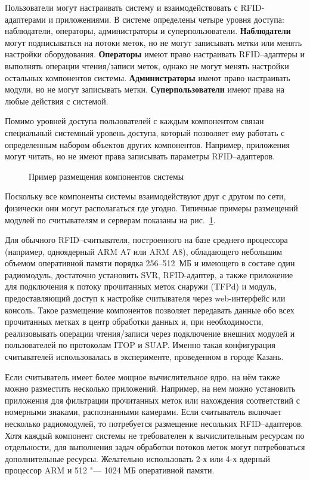 Пользователи могут настраивать систему и взаимодействовать с RFID-адаптерами и приложениями. В системе определены четыре уровня доступа: наблюдатели, операторы, администраторы и суперпользователи. \textbf{Наблюдатели} могут подписываться на потоки меток, но не могут записывать метки или менять настройки оборудования. \textbf{Операторы} имеют право настраивать RFID--адаптеры и выполнять операции чтения/записи меток, однако не могут менять настройки остальных компонентов системы. \textbf{Администраторы} имеют право настраивать модули, но не могут записывать метки. \textbf{Суперпользователи} имеют права на любые действия с системой.

Помимо уровней доступа пользователей с каждым компонентом связан специальный системный уровень доступа, который позволяет ему работать с определенным набором объектов других компонентов. Например, приложения могут читать, но не имеют права записывать параметры RFID--адаптеров.

\begin{figure}[ht]
  \caption{Пример размещения компонентов системы}
  \label{fig:ch5_deployment_example}
\end{figure}

Поскольку все компоненты системы взаимодействуют друг с другом по сети, физически они могут располагаться где угодно. Типичные примеры размещений модулей по считывателям и серверам показаны на рис.~\ref{fig:ch5_deployment_example}.

Для обычного RFID--считывателя, построенного на базе среднего процессора (например, одноядерный ARM A7 или ARM A8), обладающего небольшим объемом оперативной памяти порядка 256--512~МБ и имеющего в составе один радиомодуль, достаточно установить SVR, RFID-адаптер, а также приложение для подключения к потоку прочитанных меток снаружи (TFPd) и модуль, предоставляющий доступ к настройке считывателя через web-интерфейс или консоль. Такое размещение компонентов позволяет передавать данные обо всех прочитанных метках в центр обработки данных и, при необходимости, реализовывать операции чтения/записи через подключение внешних модулей и пользователей по протоколам ITOP и SUAP. Именно такая конфигурация считывателей использовалась в эксперименте, проведенном в городе Казань.

Если считыватель имеет более мощное вычислительное ядро, на нём также можно разместить несколько приложений. Например, на нем можно установить приложения для фильтрации прочитанных меток или нахождения соответствий с номерными знаками, распознанными камерами. Если считыватель включает несколько радиомодулей, то потребуется размещение несольких RFID--адаптеров. Хотя каждый компонент системы не требователен к вычислительным ресурсам по отдельности, для выполнения задач обработки потоков меток могут потребоваться дополнительные ресурсы. Желательно использовать 2-х или 4-х ядерный процессор ARM и 512 "--- 1024 МБ оперативной памяти.


